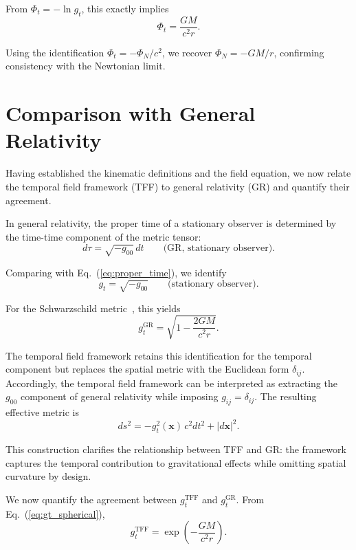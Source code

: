\documentclass[12pt]{article}
\begin{document}
From $\Phi_t = -\ln g_t$, this exactly implies 
\begin{equation}
\Phi_t = \frac{GM}{c^2 r} .
\end{equation}

Using the identification $\Phi_t = -\Phi_N/c^2$, we recover $\Phi_N = -GM/r$, confirming consistency with the Newtonian limit.


\section{Comparison with General Relativity}
\label{sec:gr_comparison}

Having established the kinematic definitions and the field equation, we now relate the temporal field framework (TFF) to general relativity (GR) and quantify their agreement.

In general relativity, the proper time of a stationary observer is determined by the time-time component of the metric tensor:
\begin{equation}
d\tau = \sqrt{-g_{00}}\, dt \qquad \text{(GR, stationary observer)} .
\end{equation}

Comparing with Eq.~(\ref{eq:proper_time}), we identify
\begin{equation}
g_t = \sqrt{-g_{00}} \qquad \text{(stationary observer)} .
\end{equation}

For the Schwarzschild metric~\cite{Schwarzschild1916}, this yields
\begin{equation}
g_t^{\text{GR}} = \sqrt{1 - \frac{2GM}{c^2 r}} .
\end{equation}

The temporal field framework retains this identification for the temporal component but replaces the spatial metric with the Euclidean form $\delta_{ij}$. Accordingly, the temporal field framework can be interpreted as extracting the $g_{00}$ component of general relativity while imposing $g_{ij} = \delta_{ij}$. The resulting effective metric is
\begin{equation}
ds^2 = -g_t^2(\mathbf{x})\, c^2 dt^2 + |d\mathbf{x}|^2 .
\label{eq:tff_metric}
\end{equation}

This construction clarifies the relationship between TFF and GR: the framework captures the temporal contribution to gravitational effects while omitting spatial curvature by design.

We now quantify the agreement between $g_t^{\text{TFF}}$ and $g_t^{\text{GR}}$. From Eq.~(\ref{eq:gt_spherical}),
$$
g_t^{\text{TFF}} = \exp\left(-\frac{GM}{c^2 r}\right) .
\label{eq:gt_tff}
$$
\end{document}
